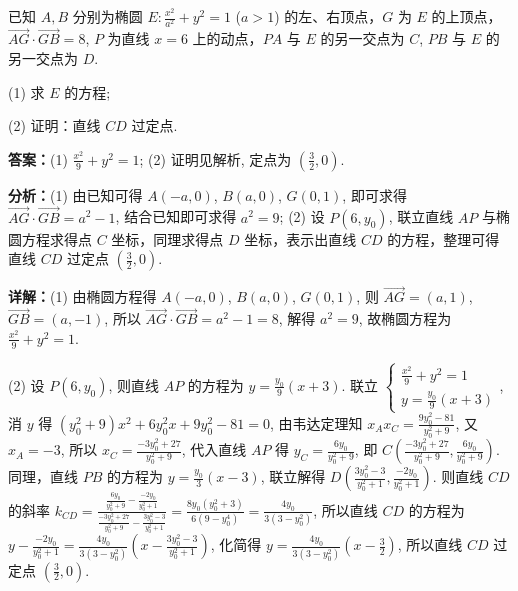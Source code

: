 \begin{question}[points=12]
已知 $A, B$ 分别为椭圆 $E: \frac{x^2}{a^2} + y^2 = 1$ ($a>1$) 的左、右顶点，$G$ 为 $E$ 的上顶点，$\overrightarrow{AG} \cdot \overrightarrow{GB} = 8$, $P$ 为直线 $x=6$ 上的动点，$PA$ 与 $E$ 的另一交点为 $C$, $PB$ 与 $E$ 的另一交点为 $D$.



(1) 求 $E$ 的方程;



(2) 证明：直线 $CD$ 过定点.
\begin{solution}
\textbf{答案：}(1) $\frac{x^2}{9} + y^2 = 1$; (2) 证明见解析, 定点为 $\left(\frac{3}{2}, 0\right)$.

\textbf{分析：}(1) 由已知可得 $A(-a,0)$, $B(a,0)$, $G(0,1)$, 即可求得 $\overrightarrow{AG}\cdot\overrightarrow{GB}=a^2-1$, 结合已知即可求得 $a^2=9$; (2) 设 $P(6,y_0)$, 联立直线 $AP$ 与椭圆方程求得点 $C$ 坐标，同理求得点 $D$ 坐标，表示出直线 $CD$ 的方程，整理可得直线 $CD$ 过定点 $\left(\frac{3}{2},0\right)$.

\textbf{详解：}(1) 由椭圆方程得 $A(-a,0)$, $B(a,0)$, $G(0,1)$, 则 $\overrightarrow{AG}=(a,1)$, $\overrightarrow{GB}=(a,-1)$, 所以 $\overrightarrow{AG}\cdot\overrightarrow{GB}=a^2-1=8$, 解得 $a^2=9$, 故椭圆方程为 $\frac{x^2}{9}+y^2=1$.

(2) 设 $P(6,y_0)$, 则直线 $AP$ 的方程为 $y=\frac{y_0}{9}(x+3)$. 联立 $\begin{cases} \frac{x^2}{9}+y^2=1 \\ y=\frac{y_0}{9}(x+3) \end{cases}$, 消 $y$ 得 $(y_0^2+9)x^2+6y_0^2x+9y_0^2-81=0$, 由韦达定理知 $x_A x_C = \frac{9y_0^2-81}{y_0^2+9}$, 又 $x_A=-3$, 所以 $x_C = \frac{-3y_0^2+27}{y_0^2+9}$, 代入直线 $AP$ 得 $y_C = \frac{6y_0}{y_0^2+9}$, 即 $C\left(\frac{-3y_0^2+27}{y_0^2+9}, \frac{6y_0}{y_0^2+9}\right)$. 同理，直线 $PB$ 的方程为 $y=\frac{y_0}{3}(x-3)$, 联立解得 $D\left(\frac{3y_0^2-3}{y_0^2+1}, \frac{-2y_0}{y_0^2+1}\right)$. 则直线 $CD$ 的斜率 $k_{CD} = \frac{\frac{6y_0}{y_0^2+9} - \frac{-2y_0}{y_0^2+1}}{\frac{-3y_0^2+27}{y_0^2+9} - \frac{3y_0^2-3}{y_0^2+1}} = \frac{8y_0(y_0^2+3)}{6(9-y_0^4)} = \frac{4y_0}{3(3-y_0^2)}$, 所以直线 $CD$ 的方程为 $y - \frac{-2y_0}{y_0^2+1} = \frac{4y_0}{3(3-y_0^2)}\left(x - \frac{3y_0^2-3}{y_0^2+1}\right)$, 化简得 $y = \frac{4y_0}{3(3-y_0^2)}\left(x - \frac{3}{2}\right)$, 所以直线 $CD$ 过定点 $\left(\frac{3}{2},0\right)$.
\end{solution}
\end{question}

